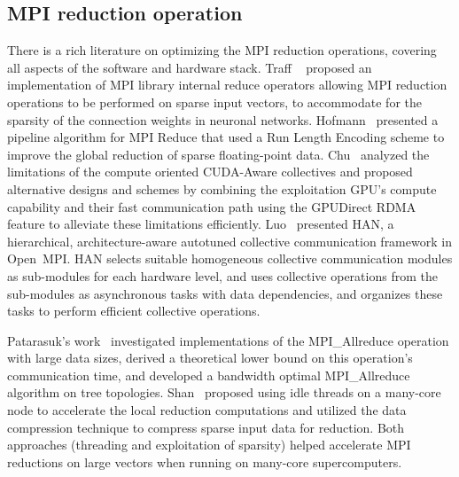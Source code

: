 \documentclass[5p,times,twocolumn]{elsarticle}
\newcommand{\ompi}[0]{Open~MPI\xspace}
\newcommand{\mpi}[0]{\textsc{MPI}\xspace}
\newcommand{\allreduce}[0]{MPI_Allreduce\xspace}
\begin{document}
\subsection{\mpi reduction operation}
There is a rich literature on optimizing the \mpi reduction operations, covering all aspects of the software and hardware stack. Traff
~\cite{NeutralMPIReduction} proposed an implementation of MPI library
internal reduce operators allowing MPI reduction operations to be performed on sparse input vectors, to accommodate for the sparsity of the connection weights in neuronal networks.
%
Hofmann~\cite{sparse-reduction} presented a pipeline algorithm for MPI Reduce
that used a Run Length Encoding scheme to improve the global reduction of sparse
floating-point data.
%
Chu~\cite{gpu-reduce} analyzed the limitations of the compute oriented CUDA-Aware
collectives and proposed alternative designs and schemes by combining the exploitation GPU's
compute capability and their fast communication
path using the GPUDirect RDMA feature to alleviate these limitations efficiently.
%
Luo~\cite{luo-han} presented HAN, a hierarchical, architecture-aware autotuned collective communication
framework in \ompi. HAN selects suitable homogeneous collective communication
modules as sub-modules for each hardware level, and uses collective operations from
the sub-modules as asynchronous tasks with data dependencies, and organizes these tasks to perform efficient collective operations.
%

Patarasuk's work~\cite{allreduce-optimal} investigated implementations of the \allreduce operation
with large data sizes, derived a theoretical lower bound on this operation's communication time, and developed
a bandwidth optimal \allreduce algorithm on tree topologies.
%
Shan~\cite{shan-reduce} proposed using idle threads on a many-core node to accelerate
the local reduction computations and utilized the data compression technique to compress sparse input data for reduction.
Both approaches (threading and exploitation
of sparsity) helped accelerate MPI reductions on large vectors when
running on many-core supercomputers.
%
\end{document}
